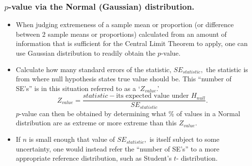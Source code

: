 \documentclass[10pt,handout]{beamer}\usepackage[]{graphicx}\usepackage[]{color}
\begin{document}
\begin{frame}
	\frametitle{$p$-value via the Normal (Gaussian) distribution.}
	
	\begin{footnotesize}
		\begin{itemize}
			\item When judging extremeness of a sample mean or proportion (or  difference between 2 sample means or proportions) calculated from an amount of information that is sufficient for the Central Limit Theorem to apply, one can use Gaussian distribution to readily obtain the $p$-value.
			\item Calculate how many standard errors of the statistic, $SE_{statistic},$ the statistic is from where null hypothesis states true value should be.  This ``number of SE's'' is in this situation referred to as a `$Z_{value}$.'
			$$Z_{value} = \frac{statistic -  \textrm{its expected value under } H_{null} }{SE_{statistic}}.$$
			$p$-value can then be obtained by determining what \% of values in a Normal distribution are as extreme or more extreme than this $Z_{value}.$
			\item
			If $n$ is small enough that value of $SE_{statistic},$ is itself subject to some 
			uncertainty, one would instead refer the ``number of SE's'' to a more appropriate reference distribution, such as Student's $t$- distribution.
		\end{itemize}
		
	\end{footnotesize}
\end{frame}
\end{document}
